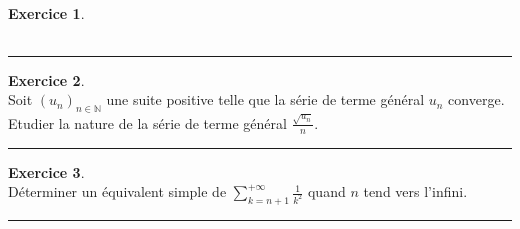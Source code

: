\documentclass[a4paper,10pt]{article}
\theoremstyle{definition}
\theoremstyle{definition}
\newtheorem{exo}{Exercice}
\newcommand{\N}{\mathbb{N}}
\begin{document}
\begin{minipage}{1\linewidth}
\begin{minipage}[t]{0.48\linewidth}
\begin{exo}
\begin{center}
\begin{tabular}{ll}
			\end{tabular}
		\end{center}
			
			\centering
			\rule{1\linewidth}{0.6pt}
		\end{exo}
	
	
		\begin{exo}\quad\\[0.2cm]
		 Soit $(u_n)_{n\in\N}$ une suite positive telle que la série de terme général $u_n$ converge. Etudier la nature de la série de terme général $\frac{\sqrt{u_n}}{n}$.
		
		\centering
		\rule{1\linewidth}{0.6pt}
		\end{exo}
	
	\begin{exo}\quad\\[0.2cm]
		Déterminer un équivalent simple de $\sum_{k=n+1}^{+\infty}\frac{1}{k^2}$ quand $n$ tend vers l'infini.
		
		\centering
		\rule{1\linewidth}{0.6pt}
	\end{exo}	
		
		
	\end{minipage}
\end{minipage}
\end{document}
